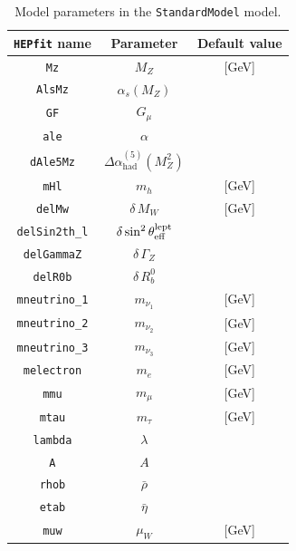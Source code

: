 \documentclass[preprint,3p,12pt]{elsarticle}
\newcommand{\HEPfit}{\texttt{HEPfit}\xspace}
\begin{document}
\begin{appendices}
\begin{table}[tb]
 \centering
 \caption{Model parameters in the {\tt StandardModel} model.}\vspace{0.2cm}
  \begin{tabular}{| c | c | c | }
\hline
\textbf{\HEPfit name}&
\textbf{Parameter}&
\textbf{Default value}\\
%
\hline
{\tt Mz} & $M_Z$ &  [GeV]\\
{\tt AlsMz} & $\alpha_s(M_Z)$ & \\
{\tt GF} & $G_\mu$ & \\
{\tt ale} & $\alpha$ & \\
{\tt dAle5Mz} & $\Delta\alpha_{\mathrm{had}}^{(5)}(M_Z^2)$ & \\
{\tt mHl} & $m_h$ &  [GeV]\\
{\tt delMw} & $\delta\,M_W$ &  [GeV]\\
{\tt delSin2th\_l} & $\delta\sin^2\theta_{\rm eff}^{\rm lept}$ & \\
{\tt delGammaZ} & $\delta\,\Gamma_Z$ & \\
{\tt delR0b} & $\delta\,R_b^0$ & \\
{\tt mneutrino\_1} & $m_{\nu_1}$ &  [GeV]\\
{\tt mneutrino\_2} & $m_{\nu_2}$ &  [GeV]\\
{\tt mneutrino\_3} & $m_{\nu_3}$ &  [GeV]\\
{\tt melectron} & $m_e$ &  [GeV]\\
{\tt mmu} & $m_\mu$ &  [GeV]\\
{\tt mtau} & $m_\tau$ &  [GeV]\\
{\tt lambda} & $\lambda$ & \\
{\tt A} & $A$ & \\
{\tt rhob} & $\bar{\rho}$ & \\
{\tt etab} & $\bar{\eta}$ & \\
{\tt muw} & $\mu_W$ &  [GeV]\\
\hline
  \end{tabular}
 \label{tab:SMpars}
\end{table} 


\end{appendices}
\end{document}
